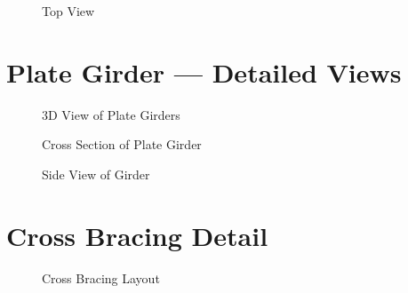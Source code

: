 \documentclass[12pt,a4paper]{report}
\numberwithin{table}{chapter}
\numberwithin{figure}{chapter}
\begin{document}
\begin{figure}[H]
\centering
{}
\caption{Top View}
\label{fig:top-view}
\end{figure}


\section{Plate Girder --- Detailed Views}
\label{sec:girder-views}

\begin{figure}[H]
\centering
{}
\caption{3D View of Plate Girders}
\label{fig:girder-3d}
\end{figure}


\begin{figure}[H]
\centering
{}
\caption{Cross Section of Plate Girder}
\label{fig:girder-xsec}
\end{figure}


\begin{figure}[H]
\centering
{}
\caption{Side View of Girder}
\label{fig:girder-side}
\end{figure}


\section{Cross Bracing Detail}
\label{sec:bracing-detail}

\begin{figure}[H]
\centering
{}
\caption{Cross Bracing Layout}
\label{fig:cb-layout}
\end{figure}


\noindent
\begin{minipage}[t]{0.31\textwidth}
\centering
{}
\label{fig:cb-bracing-sec}
\end{minipage}
\hfill
\begin{minipage}[t]{0.31\textwidth}
\centering
{}
\label{fig:cb-top-chord}
\end{minipage}
\hfill
\begin{minipage}[t]{0.31\textwidth}
\centering
{}
\label{fig:cb-bottom-chord}
\end{minipage}
            
\end{document}
